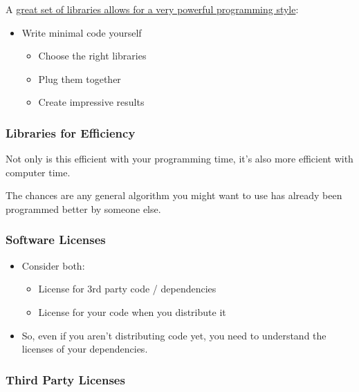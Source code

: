A
\href{http://github-pages.ucl.ac.uk/rsd-engineeringcourse/ch04packaging/01Libraries.html}{great
set of libraries allows for a very powerful programming style}:

\begin{itemize}
\itemsep1pt\parskip0pt
\item
  Write minimal code yourself

  \begin{itemize}
  \itemsep1pt\parskip0pt
  \item
    Choose the right libraries
  \item
    Plug them together
  \item
    Create impressive results
  \end{itemize}
\end{itemize}

\subsubsection{Libraries for Efficiency}\label{libraries-for-efficiency}

Not only is this efficient with your programming time, it's also more
efficient with computer time.

The chances are any general algorithm you might want to use has already
been programmed better by someone else.

\subsubsection{Software Licenses}\label{software-licenses}

\begin{itemize}
\itemsep1pt\parskip0pt
\item
  Consider both:

  \begin{itemize}
  \itemsep1pt\parskip0pt
  \item
    License for 3rd party code / dependencies
  \item
    License for your code when you distribute it
  \end{itemize}
\item
  So, even if you aren't distributing code yet, you need to understand
  the licenses of your dependencies.
\end{itemize}

\subsubsection{Third Party Licenses}\label{third-party-licenses}

